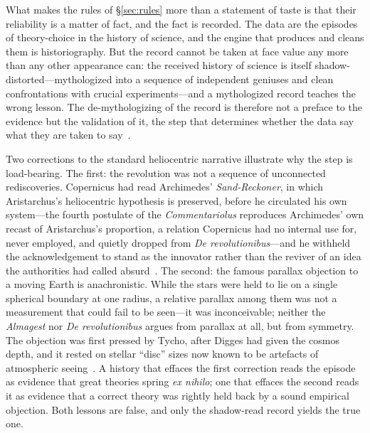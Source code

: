 \documentclass[11pt,a4paper]{article}
\begin{document}
What makes the rules of \S\ref{sec:rules} more than a statement of taste is that their reliability is a matter of fact, and the fact is recorded. The data are the episodes of theory-choice in the history of science, and the engine that produces and cleans them is historiography. But the record cannot be taken at face value any more than any other appearance can: the received history of science is itself shadow-distorted---mythologized into a sequence of independent geniuses and clean confrontations with crucial experiments---and a mythologized record teaches the wrong lesson. The de-mythologizing of the record is therefore not a preface to the evidence but the validation of it, the step that determines whether the data say what they are taken to say~\cite{JanzenSettingRecord}.

Two corrections to the standard heliocentric narrative illustrate why the step is load-bearing. The first: the revolution was not a sequence of unconnected rediscoveries. Copernicus had read Archimedes' \emph{Sand-Reckoner}, in which Aristarchus's heliocentric hypothesis is preserved, before he circulated his own system---the fourth postulate of the \emph{Commentariolus} reproduces Archimedes' own recast of Aristarchus's proportion, a relation Copernicus had no internal use for, never employed, and quietly dropped from \emph{De revolutionibus}---and he withheld the acknowledgement to stand as the innovator rather than the reviver of an idea the authorities had called absurd~\cite{JanzenSettingRecord, ArchimedesSandReckoner, CopernicusCommentariolus}. The second: the famous parallax objection to a moving Earth is anachronistic. While the stars were held to lie on a single spherical boundary at one radius, a relative parallax among them was not a measurement that could fail to be seen---it was inconceivable; neither the \emph{Almagest} nor \emph{De revolutionibus} argues from parallax at all, but from symmetry. The objection was first pressed by Tycho, after Digges had given the cosmos depth, and it rested on stellar ``disc'' sizes now known to be artefacts of atmospheric seeing~\cite{JanzenSettingRecord, CopernicusDeRev}. A history that effaces the first correction reads the episode as evidence that great theories spring \emph{ex nihilo}; one that effaces the second reads it as evidence that a correct theory was rightly held back by a sound empirical objection. Both lessons are false, and only the shadow-read record yields the true one.
\end{document}
